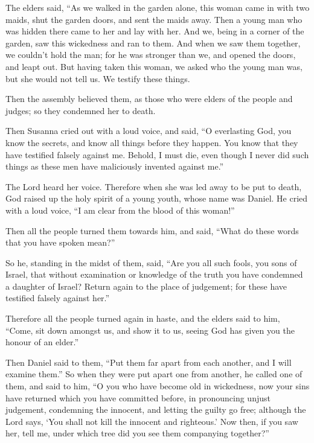  The elders said, ``As we walked in the garden alone, this
woman came in with two maids, shut the garden doors, and sent the maids
away.  Then a young man who was hidden there came to her
and lay with her.  And we, being in a corner of the garden,
saw this wickedness and ran to them.  And when we saw them
together, we couldn't hold the man; for he was stronger than we, and
opened the doors, and leapt out.  But having taken this
woman, we asked who the young man was, but she would not tell us. We
testify these things.

 Then the assembly believed them, as those who were elders
of the people and judges; so they condemned her to death.

 Then Susanna cried out with a loud voice, and said, ``O
everlasting God, you know the secrets, and know all things before they
happen.  You know that they have testified falsely against
me. Behold, I must die, even though I never did such things as these men
have maliciously invented against me.''

 The Lord heard her voice.  Therefore when she
was led away to be put to death, God raised up the holy spirit of a
young youth, whose name was Daniel.  He cried with a loud
voice, ``I am clear from the blood of this woman!''

 Then all the people turned them towards him, and said,
``What do these words that you have spoken mean?''

 So he, standing in the midst of them, said, ``Are you all
such fools, you sons of Israel, that without examination or knowledge of
the truth you have condemned a daughter of Israel?  Return
again to the place of judgement; for these have testified falsely
against her.''

 Therefore all the people turned again in haste, and the
elders said to him, ``Come, sit down amongst us, and show it to us,
seeing God has given you the honour of an elder.''

 Then Daniel said to them, ``Put them far apart from each
another, and I will examine them.''  So when they were put
apart one from another, he called one of them, and said to him, ``O you
who have become old in wickedness, now your sins have returned which you
have committed before,  in pronouncing unjust judgement,
condemning the innocent, and letting the guilty go free; although the
Lord says, `You shall not kill the innocent and righteous.'
 Now then, if you saw her, tell me, under which tree did
you see them companying together?''

